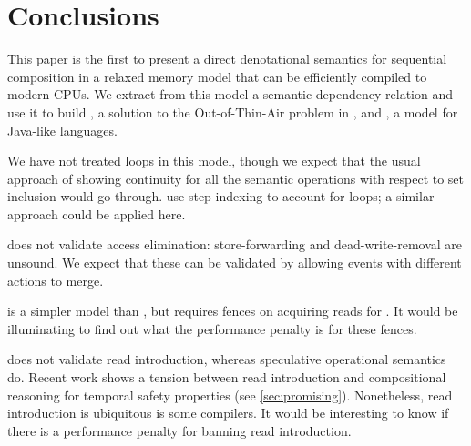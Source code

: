 \section{Conclusions} %

This paper is the first to present a direct denotational semantics for
sequential composition in a relaxed memory model that can be
efficiently compiled to modern CPUs. We extract from this model a semantic
dependency relation and use it to build \PwTc, a solution to the
Out-of-Thin-Air problem in \cXI, and \PwTmca{}, a model for Java-like
languages.

We have not treated loops in this model, though we expect that the usual
approach of showing continuity for all the semantic operations with respect
to set inclusion would go through. \citet{DBLP:conf/esop/PaviottiCPWOB20} use
step-indexing to account for loops; a similar approach could be applied here.

\PwTmca{} does not validate access elimination: store-forwarding and
dead-write-removal are unsound.  We expect that these can be validated by
allowing events with different actions to merge. %

 is a simpler model than , but requires fences on
acquiring reads for \armeight{}.  It would be illuminating to find out what
the performance penalty is for these fences.

\PwT{} does not validate read introduction, whereas speculative operational
semantics do.  Recent work shows a tension between read introduction and
compositional reasoning for temporal safety properties (see
\textsection\ref{sec:promising}).  Nonetheless, read introduction is
ubiquitous is some compilers.  It would be interesting to know if there is a
performance penalty for banning read introduction.





